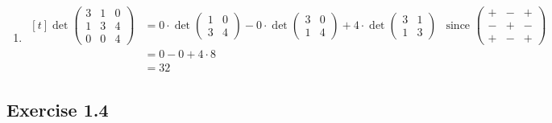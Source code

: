 \documentclass[11pt,fleqn]{book} %
\begin{document}
\begin{enumerate}
    \item 
    $\begin{aligned}[t]
        \det \begin{pmatrix} 3 & 1 & 0 \\ 1 & 3 & 4 \\ 0 & 0 & 4 \end{pmatrix} & = 0 \cdot \det \begin{pmatrix} 1 & 0 \\ 3 & 4 \end{pmatrix} - 0 \cdot \det \begin{pmatrix} 3 & 0 \\ 1 & 4 \end{pmatrix} + 4 \cdot \det \begin{pmatrix} 3 & 1 \\ 1 & 3 \end{pmatrix}
        & \text{since }\begin{pmatrix} + & - & + \\ - & + & - \\ + & - & + \end{pmatrix}             \\
                                                                               & = 0 - 0 + 4 \cdot 8 \\
                                                                               & = 32
    \end{aligned}$
\end{enumerate}

\subsection*{Exercise 1.4}
\end{document}
